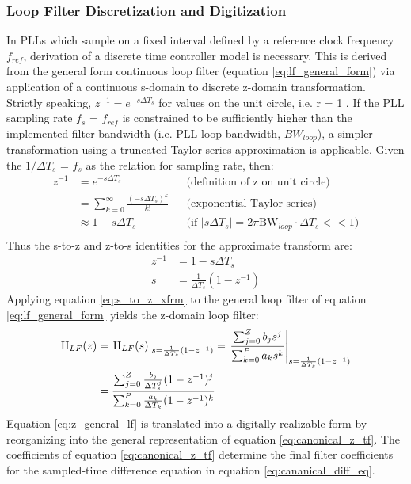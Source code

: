 		\subsubsection{Loop Filter Discretization and Digitization}\label{lf-discretization}
			In PLLs which sample on a fixed interval defined by a reference clock frequency $f_{ref}$, derivation of a discrete time controller model is necessary. This is derived from the general form continuous loop filter (equation \ref{eq:lf_general_form}) via application of a continuous s-domain to discrete z-domain transformation. Strictly speaking, $z^{-1} = e^{-s\Delta T_s}$ for values on the unit circle, i.e. r = 1 \cite{proakis_1993_z}. If the PLL sampling rate $f_s$ = $f_{ref}$ is constrained to be sufficiently higher than the implemented filter bandwidth (i.e. PLL loop bandwidth, $BW_{loop}$), a simpler transformation using a truncated Taylor series approximation is applicable. Given the $1/\Delta T_s$ = $f_{s}$ as the relation for sampling rate, then:
			\begin{align*}
				z^{-1} &= e^{-s\Delta T_s} && \text{(definition of z on unit circle)} \\
				&= \sum_{k=0}^\infty\frac{(-s\Delta T_s)^k}{k!} && \text{(exponential Taylor series)} \\
				&\approx 1-s\Delta T_s &&\text{(if $|s\Delta T_s| = 2\pi\mathrm{BW}_{loop}\cdot \Delta T_s << 1$)} \\
			\end{align*}
			Thus the s-to-z and z-to-s identities for the approximate transform are:
			\begin{align}
				z^{-1} &= 1-s\Delta T_s\\
				s &= \frac{1}{\Delta T_s}(1-z^{-1}) \label{eq:s_to_z_xfrm}
			\end{align}
			Applying equation \ref{eq:s_to_z_xfrm} to the general loop filter of equation \ref{eq:lf_general_form} yields the z-domain loop filter:
			\begin{align}
				\textnormal{H}_{LF}(z) &= \left.\textnormal{H}_{LF}(s)\right\vert_{s=\frac{1}{\Delta T_s}(1-z^{-1})} = \left.\frac{\sum_{j=0}^Z b_js^j}{\sum_{k=0}^P a_ks^k}\right\vert_{s=\frac{1}{\Delta T_s}(1-z^{-1})}\\
				&= \frac{\sum_{j=0}^Z \frac{b_j}{\Delta T_s^j}(1-z^{-1})^j}{\sum_{k=0}^P \frac{a_k}{\Delta T_k}(1-z^{-1})^k} \label{eq:z_general_lf}
			\end{align}
			Equation \ref{eq:z_general_lf} is translated into a digitally realizable form by reorganizing into the general representation of equation \ref{eq:canonical_z_tf}. The coefficients of equation \ref{eq:canonical_z_tf} determine the final filter coefficients for the sampled-time difference equation in equation \ref{eq:cananical_diff_eq}. 
